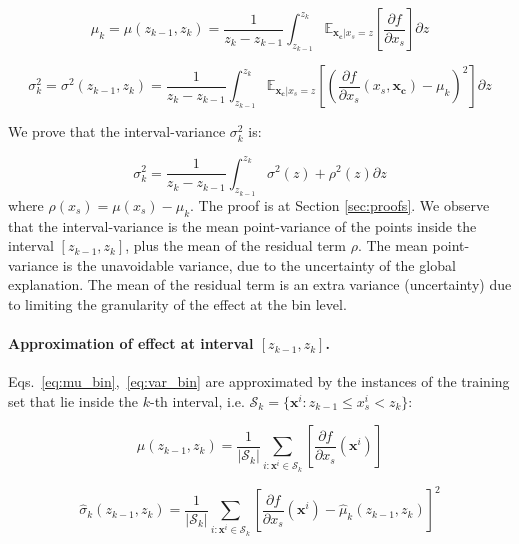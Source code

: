 \documentclass{article}
\newcommand{\dfdx}{\frac{\partial f}{\partial x_s}}
\newcommand{\xc}{\mathbf{x_c}}
\begin{document}
\begin{equation}
  \label{eq:mu_bin}
  \mu_k = \mu(z_{k-1}, z_k) = \frac{1}{z_k - z_{k-1}} \int_{z_{k-1}}^{z_k}
  \mathbb{E}_{\xc|x_s=z}\left [\frac{\partial f}{\partial x_s} \right ] \partial z
\end{equation}

\noindent

\begin{equation}
  \label{eq:var_bin}
  \sigma^2_k = \sigma^2(z_{k-1}, z_k) = \frac{1}{z_k - z_{k-1}} \int_{z_{k-1}}^{z_k}
  \mathbb{E}_{\xc|x_s=z} \left [ (\frac{\partial
      f}{\partial x_s}(x_s, \xc) - \mu_k )^2 \right] \partial z
\end{equation}

\noindent
We prove that the interval-variance \(\sigma^2_k \) is:

\begin{equation}
 \sigma^2_k = \frac{1}{z_k - z_{k-1}} \int_{z_{k-1}}^{z_k} \sigma^2(z) + \rho^2(z) \partial z
\end{equation}
%
where \(\rho(x_s) = \mu(x_s) - \mu_k\).
The proof is at Section \ref{sec:proofs}.
We observe that the interval-variance is the mean point-variance of the points
inside the interval \([z_{k-1}, z_k]\), plus the mean of the residual term \(\rho\).
The mean point-variance is the unavoidable variance, due to the uncertainty of the global explanation.
The mean of the residual term is an extra variance (uncertainty) due to limiting the granularity of the effect at
the bin level.

\noindent

\paragraph{Approximation of effect at interval \([z_{k-1}, z_k]\).}
Eqs.~\eqref{eq:mu_bin},~\eqref{eq:var_bin} are
approximated by the instances of the training set that lie inside the
\(k\)-th interval, i.e.
\( \mathcal{S}_k = \{ \mathbf{x}^i : z_{k-1} \leq x^i_s < z_{k} \} \):

\begin{equation}
  \label{eq:mean_estimation}
  \hat{\mu}(z_{k-1}, z_k) = \frac{1}{|\mathcal{S}_k|} \sum_{i:\mathbf{x}^i \in
    \mathcal{S}_k} \left [ \dfdx(\mathbf{x}^i) \right ]
\end{equation}

\begin{equation}
  \label{eq:variance_estimation}
  \hat{\sigma}_k(z_{k-1}, z_k) = \frac{1}{|\mathcal{S}_k|} \sum_{i:\mathbf{x}^i \in
  \mathcal{S}_k} \left [ \dfdx(\mathbf{x}^i) - \hat{\mu}_k(z_{k-1}, z_k) \right ]^2
\end{equation}
\end{document}
